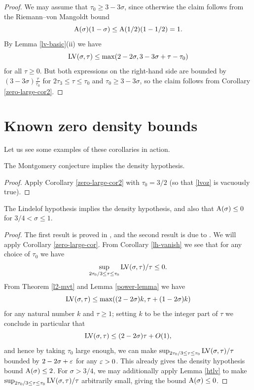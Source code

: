 \begin{proof}  We may assume that $\tau_0 \geq 3-3\sigma$, since otherwise the claim follows from the Riemann--von Mangoldt bound
    $$ \mathrm{A}(\sigma)(1-\sigma) \leq \mathrm{A}(1/2)(1-1/2) = 1.$$
    By Lemma \ref{lv-basic}(ii) we have
$$ \mathrm{LV}(\sigma,\tau) \leq \max( 2-2\sigma, 3-3\sigma + \tau - \tau_0 )$$
for all $\tau \geq 0$.  But both expressions on the right-hand side are bounded by $(3-3\sigma) \frac{\tau}{\tau_0}$ for $2\tau_3 \leq \tau \leq \tau_0$ and $\tau_0 \geq 3-3\sigma$, so the claim follows from Corollary \ref{zero-large-cor2}.
\end{proof}

\section{Known zero density bounds}

Let us see some examples of these corollaries in action.

\begin{theorem}\label{montgomery_implies_density} The Montgomery conjecture implies the density hypothesis.
\end{theorem}

\begin{proof}  Apply Corollary \ref{zero-large-cor2} with $\tau_0=3/2$ (so that \eqref{lvoz} is vacuously true).
\end{proof}

\begin{theorem}\label{lindelof_implies_density} The Lindelof hypothesis implies the density hypothesis, and also that $\mathrm{A}(\sigma) \leq 0$ for $3/4 < \sigma \leq 1$.
\end{theorem}

\begin{proof} The first result is proved in \cite{ingham_estimation_1940}, and the second result is due to \cite{halasz_distribution_1969}. We will apply Corollary \ref{zero-large-cor}.  From Corollary \ref{lh-vanish} we see that for any choice of $\tau_0$ we have
$$ \sup_{2\tau_0/3 \leq \tau \leq \tau_0} \mathrm{LV}(\sigma,\tau)/\tau \leq 0.$$
From Theorem \ref{l2-mvt} and Lemma \ref{power-lemma} we have
\begin{equation}\label{ap}
     \mathrm{LV}(\sigma,\tau) \leq \max( (2-2\sigma)k, \tau + (1 - 2 \sigma)k )
\end{equation}
for any natural number $k$ and $\tau \geq 1$; setting $k$ to be the integer part of $\tau$ we conclude in particular that
$$ \mathrm{LV}(\sigma,\tau) \leq (2-2\sigma)\tau + O(1),$$
and hence by taking $\tau_0$ large enough, we can make
$\sup_{2\tau_0/3 \leq \tau \leq \tau_0} \mathrm{LV}(\sigma,\tau)/\tau$ bounded by $2-2\sigma + \varepsilon$ for any $\varepsilon>0$.  This already gives the density hypothesis bound $\mathrm{A}(\sigma) \leq 2$.  For $\sigma > 3/4$, we may additionally apply Lemma \ref{htlv} to make
$\sup_{2\tau_0/3 \leq \tau \leq \tau_0} \mathrm{LV}(\sigma,\tau)/\tau$ arbitrarily small, giving the bound $\mathrm{A}(\sigma) \leq 0$.
\end{proof}

